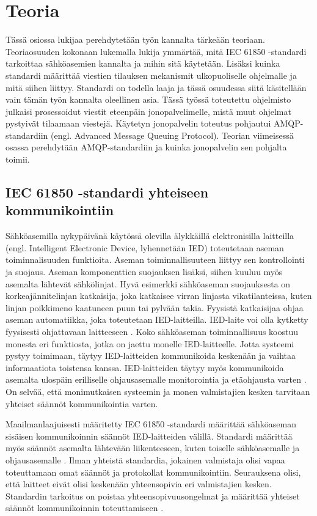 \chapter{Teoria}
\label{ch:teoria}
Tässä osiossa lukijaa perehdytetään työn kannalta tärkeään teoriaan. Teoriaosuuden kokonaan lukemalla lukija ymmärtää, mitä IEC 61850 -standardi tarkoittaa sähköasemien kannalta ja mihin sitä käytetään. Lisäksi kuinka standardi määrittää viestien tilauksen mekanismit ulkopuoliselle ohjelmalle ja mitä siihen liittyy. Standardi on todella laaja ja tässä osuudessa siitä käsitellään vain tämän työn kannalta oleellinen asia. Tässä työssä toteutettu ohjelmisto julkaisi prosessoidut viestit eteenpäin jonopalvelimelle, mistä muut ohjelmat pystyivät tilaamaan viestejä. Käytetyn jonopalvelin toteutus pohjautui AMQP-standardiin (engl. Advanced Message Queuing Protocol). Teorian viimeisessä osassa perehdytään AMQP-standardiin ja kuinka jonopalvelin sen pohjalta toimii.


\section{IEC 61850 -standardi yhteiseen kommunikointiin}
Sähköasemilla nykypäivänä käytössä olevilla älykkäillä elektronisilla laitteilla (engl. Intelligent Electronic Device, lyhennetään IED) toteutetaan aseman toiminnalisuuden funktioita. Aseman toiminnallisuuteen liittyy sen kontrollointi ja suojaus. Aseman komponenttien suojauksen lisäksi, siihen kuuluu myös asemalta lähtevät sähkölinjat. Hyvä esimerkki sähköaseman suojauksesta on korkeajännitelinjan katkaisija, joka katkaisee virran linjasta vikatilanteissa, kuten linjan poikkimeno kaatuneen puun tai pylvään takia. Fyysistä katkaisijaa ohjaa aseman automatiikka, joka toteutetaan IED-laitteilla. IED-laite voi olla kytketty fyysisesti ohjattavaan laitteeseen \cite[s.~63--64]{IEC61850-7-1}. Koko sähköaseman toiminnallisuus koostuu monesta eri funktiosta, jotka on jaettu monelle IED-laitteelle. Jotta systeemi pystyy toimimaan, täytyy IED-laitteiden kommunikoida keskenään ja vaihtaa informaatiota toistensa kanssa. IED-laitteiden täytyy myös kommunikoida asemalta ulospäin erilliselle ohjausasemalle monitorointia ja etäohjausta varten \cite[s.~1]{Brunner2008}. On selvää, että monimutkaisen systeemin ja monen valmistajien kesken tarvitaan yhteiset säännöt kommunikointia varten.

Maailmanlaajuisesti määritetty IEC 61850 -standardi määrittää sähköaseman sisäisen kommunikoinnin säännöt IED-laitteiden välillä. Standardi määrittää myös säännöt asemalta lähtevään liikenteeseen, kuten toiselle sähköasemalle ja ohjausasemalle \cite[s.~10]{IEC61850-7-1}. Ilman yhteistä standardia, jokainen valmistaja olisi vapaa toteuttamaan omat säännöt ja protokollat kommunikointiin. Seurauksena olisi, että laitteet eivät olisi keskenään yhteensopivia eri valmistajien kesken. Standardin tarkoitus on poistaa yhteensopivuusongelmat ja määrittää yhteiset säännöt kommunikoinnin toteuttamiseen \cite[s.~1]{Kaneda2008}.

